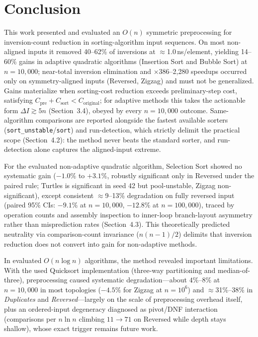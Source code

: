 \documentclass[namedate,webpdf,contemporary,large]{TBench-template}%
\theoremstyle{thmstyleone}%
\theoremstyle{thmstyletwo}%
\theoremstyle{thmstylethree}%
\begin{document}
\section{Conclusion}\label{sec:conclusion}
This work presented and evaluated an $O(n)$ symmetric preprocessing for inversion-count reduction in sorting-algorithm input sequences. On most non-aligned inputs it removed 40--62\% of inversions at $\approx$1.0\,ns/element, yielding 14--60\% gains in adaptive quadratic algorithms (Insertion Sort and Bubble Sort) at $n{=}10{,}000$; near-total inversion elimination and $\times$386--2,280 speedups occurred only on symmetry-aligned inputs (Reversed, Zigzag) and must not be generalized. Gains materialize when sorting-cost reduction exceeds preliminary-step cost, satisfying $C_{\text{pre}} + C_{\text{sort}} < C_{\text{original}}$; for adaptive methods this takes the actionable form $\Delta I \gtrsim 5n$ (Section~3.4), obeyed by every $n{=}10{,}000$ outcome. Same-algorithm comparisons are reported alongside the fastest available sorters (\texttt{sort\_unstable}/\texttt{sort}) and run-detection, which strictly delimit the practical scope (Section~4.2): the method never beats the standard sorter, and run-detection alone captures the aligned-input extreme.

For the evaluated non-adaptive quadratic algorithm, Selection Sort showed no systematic gain ($-1.0\%$ to $+3.1\%$, robustly significant only in Reversed under the paired rule; Turtles is significant in seed 42 but pool-unstable, Zigzag non-significant), except consistent $\approx$9--13\% degradation on fully reversed input (paired 95\% CIs: $-9.1\%$ at $n{=}10{,}000$, $-12.8\%$ at $n{=}100{,}000$), traced by operation counts and assembly inspection to inner-loop branch-layout asymmetry rather than misprediction rates (Section~4.3). This theoretically predicted neutrality via comparison-count invariance ($n(n-1)/2$) delimits that inversion reduction does not convert into gain for non-adaptive methods.

In evaluated $O(n \log n)$ algorithms, the method revealed important limitations. With the used Quicksort implementation (three-way partitioning and median-of-three), preprocessing caused systematic degradation---about $4\%$--$8\%$ at $n{=}10{,}000$ in most topologies ($-4.5\%$ for Zigzag at $n{=}10^6$) and $\approx$31\%--38\% in \emph{Duplicates} and \emph{Reversed}---largely on the scale of preprocessing overhead itself, plus an ordered-input degeneracy diagnosed as pivot/DNF interaction (comparisons per $n\ln n$ climbing $11{\to}71$ on Reversed while depth stays shallow), whose exact trigger remains future work.
\end{document}
